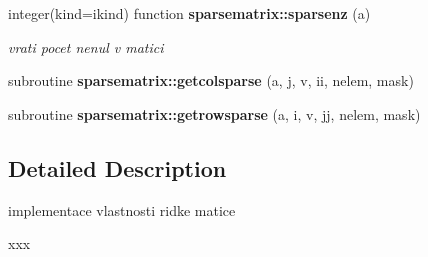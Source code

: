 \begin{DoxyCompactItemize}
integer(kind=ikind) function {\bf sparsematrix\+::sparsenz} (a)
\begin{DoxyCompactList}\small\item\em vrati pocet nenul v matici \end{DoxyCompactList}\item 
subroutine {\bf sparsematrix\+::getcolsparse} (a, j, v, ii, nelem, mask)
\item 
subroutine {\bf sparsematrix\+::getrowsparse} (a, i, v, jj, nelem, mask)
\end{DoxyCompactItemize}


\subsection{Detailed Description}
implementace vlastnosti ridke matice 

xxx 